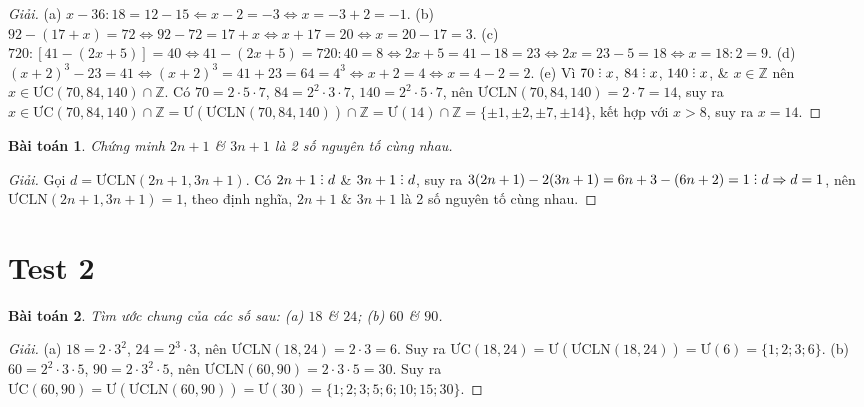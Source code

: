 \documentclass{article}
\numberwithin{equation}{section}
\newtheorem{baitoan}{Bài toán}[section]
\DeclareRobustCommand{\divby}{%
	\mathrel{\vbox{\baselineskip.65ex\lineskiplimit0pt\hbox{.}\hbox{.}\hbox{.}}}%
}
\begin{document}
\begin{proof}[Giải]
	(a) $x - 36:18 = 12 - 15\Leftarrow x - 2 = -3\Leftrightarrow x = -3 + 2 = -1$. (b) $92 - (17 + x) = 72\Leftrightarrow 92 - 72 = 17 + x\Leftrightarrow x + 17 = 20\Leftrightarrow x = 20 - 17 = 3$. (c) $720:[41 - (2x + 5)] = 40\Leftrightarrow 41 - (2x + 5) = 720:40 = 8\Leftrightarrow 2x + 5 = 41 - 18 = 23\Leftrightarrow 2x = 23 - 5 = 18\Leftrightarrow x = 18:2 = 9$. (d) $(x + 2)^3 - 23 = 41\Leftrightarrow(x + 2)^3 = 41 + 23 = 64 = 4^3\Leftrightarrow x + 2 = 4\Leftrightarrow x = 4 - 2 = 2$. (e) Vì $70\divby x$, $84\divby x$, $140\divby x$, \& $x\in\mathbb{Z}$ nên $x\in\mbox{ƯC}(70,84,140)\cap\mathbb{Z}$. Có $70 = 2\cdot5\cdot7$, $84 = 2^2\cdot3\cdot7$, $140 = 2^2\cdot5\cdot7$, nên $\mbox{ƯCLN}(70,84,140) = 2\cdot7 = 14$, suy ra $x\in\mbox{ƯC}(70,84,140)\cap\mathbb{Z} = \mbox{Ư}(\mbox{ƯCLN}(70,84,140))\cap\mathbb{Z} = \mbox{Ư}(14)\cap\mathbb{Z} = \{\pm1,\pm2,\pm7,\pm14\}$, kết hợp với $x > 8$, suy ra $x = 14$.
\end{proof}

\begin{baitoan}
	Chứng minh $2n + 1$ \& $3n + 1$ là 2 số nguyên tố cùng nhau.
\end{baitoan}

\begin{proof}[Giải]
	Gọi $d = \mbox{ƯCLN}(2n + 1,3n + 1)$. Có $2n + 1\divby d$ \& $3n + 1\divby d$, suy ra $3(2n + 1) - 2(3n + 1) = 6n + 3 - (6n + 2) = 1\divby d\Rightarrow d = 1$, nên $\mbox{ƯCLN}(2n + 1,3n + 1) = 1$, theo định nghĩa, $2n + 1$ \& $3n + 1$ là 2 số nguyên tố cùng nhau.
\end{proof}


\section{Test 2}

\begin{baitoan}
	Tìm ước chung của các số sau: (a) $18$ \& $24$; (b) $60$ \& $90$.
\end{baitoan}

\begin{proof}[Giải]
	(a) $18 = 2\cdot3^2$, $24 = 2^3\cdot3$, nên $\mbox{ƯCLN}(18,24) = 2\cdot3 = 6$. Suy ra $\mbox{ƯC}(18,24) = \mbox{Ư}(\mbox{ƯCLN}(18,24)) = \mbox{Ư}(6) = \{1;2;3;6\}$. (b) $60 = 2^2\cdot3\cdot5$, $90 = 2\cdot3^2\cdot5$, nên $\mbox{ƯCLN}(60,90) = 2\cdot3\cdot5 = 30$. Suy ra $\mbox{ƯC}(60,90) = \mbox{Ư}(\mbox{ƯCLN}(60,90)) = \mbox{Ư}(30) = \{1;2;3;5;6;10;15;30\}$.
\end{proof}
\end{document}
